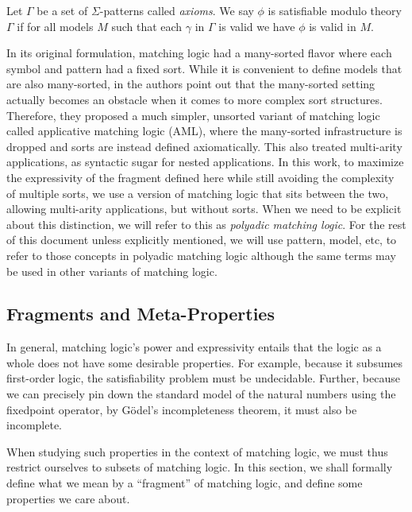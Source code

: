\begin{definition}Let \(\Gamma\) be a set of \(\Sigma\)-patterns called \emph{axioms}.
We say \(\phi\) is satisfiable modulo theory \(\Gamma\)
if for all models \(M\)
such that each \(\gamma\) in \(\Gamma\) is valid we have \(\phi\) is valid in \(M\).\end{definition}

\begin{remark}In its original formulation, matching logic had a many-sorted flavor where each symbol and pattern had a fixed sort.
While it is convenient to define models that are also many-sorted,
in \cite{applicative-matching-logic} the authors point out that
the many-sorted setting actually becomes an obstacle when it comes to
more complex sort structures.
Therefore, they proposed a much simpler, unsorted variant of matching logic called applicative matching logic (AML),
where the many-sorted infrastructure is dropped and sorts are instead defined axiomatically.
This also treated multi-arity applications, as syntactic sugar for nested applications.
In this work, to maximize the expressivity of the fragment defined here
while still avoiding the complexity of multiple sorts,
we use a version of matching logic that sits between the two,
allowing multi-arity applications, but without sorts.
When we need to be explicit about this distinction, we will refer to this as \emph{polyadic matching logic}.
For the rest of this document unless explicitly mentioned,
we will use pattern, model, etc, to refer to those concepts in polyadic matching logic
although the same terms may be used in other variants of matching logic.\end{remark}

\hypertarget{fragments-and-meta-properties}{%
\subsection{Fragments and Meta-Properties}\label{fragments-and-meta-properties}}

In general, matching logic's power and expressivity entails
that the logic as a whole does not have some desirable properties.
For example, because it subsumes first-order logic, the satisfiability problem must be undecidable.
Further, because we can precisely pin down the standard model of the natural
numbers using the fixedpoint operator, by G\"odel's incompleteness theorem, it
must also be incomplete.

When studying such properties in the context of matching logic, we must thus restrict ourselves to subsets of matching logic.
In this section, we shall formally define what we mean by a ``fragment'' of matching logic,
and define some properties we care about.

